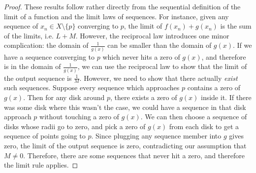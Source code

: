 \begin{proof}
These results follow rather directly from the sequential definition of the limit of a function and the limit laws of sequences. For instance, given any sequence of $x_n \in X\setminus\{p\}$ converging to $p$, the limit of $f(x_n)+g(x_n)$ is the sum of the limits, i.e. $L+M$. However, the reciprocal law introduces one minor complication: the domain of $\frac{1}{g(x)}$ can be smaller than the domain of $g(x)$. If we have a sequence converging to $p$ which never hits a zero of $g(x)$, and therefore is in the domain of $\frac{1}{g(x)}$, we can use the reciprocal law to show that the limit of the output sequence is $\frac{1}{M}$. However, we need to show that there actually \emph{exist} such sequences. Suppose every sequence which approaches $p$ contains a zero of $g(x)$. Then for any disk around $p$, there exists a zero of $g(x)$ inside it. If there was some disk where this wasn't the case, we could have a sequence in that disk approach $p$ without touching a zero of $g(x)$. We can then choose a sequence of disks whose radii go to zero, and pick a zero of $g(x)$ from each disk to get a sequence of points going to $p$. Since plugging any sequence member into $g$ gives zero, the limit of the output sequence is zero, contradicting our assumption that $M \neq 0$. Therefore, there are some sequences that never hit a zero, and therefore the limit rule applies.
\end{proof}
